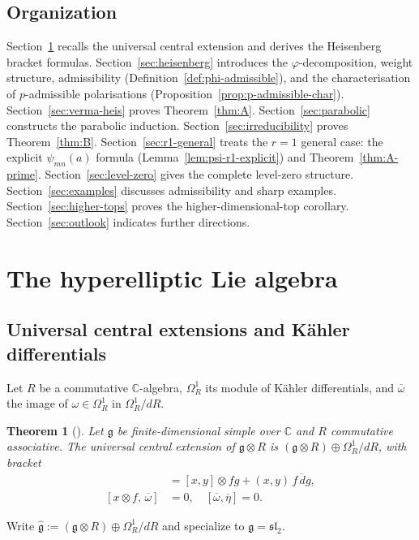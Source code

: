 \documentclass{amsart}
\newcommand{\Cx}{\mathbb{C}}
\newcommand{\g}{\mathfrak{g}}
\newcommand{\sltwo}{\mathfrak{sl}_2}
\newcommand{\wh}[1]{\widehat{#1}}
\newcommand{\whg}{\wh{\g}}
\newcommand{\ol}{\overline}
\newtheorem{theorem}{Theorem}[section]
\theoremstyle{definition}
\theoremstyle{remark}
\numberwithin{equation}{section}
\begin{document}
\subsection*{Organization}
Section~\ref{sec:hyperelliptic} recalls the universal central extension
and derives the Heisenberg bracket formulas.
Section~\ref{sec:heisenberg} introduces the $\varphi$-decomposition,
weight structure, admissibility (Definition~\ref{def:phi-admissible}),
and the characterisation of $p$-admissible polarisations
(Proposition~\ref{prop:p-admissible-char}).
Section~\ref{sec:verma-heis} proves Theorem~\ref{thm:A}.
Section~\ref{sec:parabolic} constructs the parabolic induction.
Section~\ref{sec:irreducibility} proves Theorem~\ref{thm:B}.
Section~\ref{sec:r1-general} treats the $r=1$ general case:
the explicit $\psi_{mn}(a)$ formula (Lemma~\ref{lem:psi-r1-explicit})
and Theorem~\ref{thm:A-prime}.
Section~\ref{sec:level-zero} gives the complete level-zero structure.
Section~\ref{sec:examples} discusses admissibility and sharp examples.
Section~\ref{sec:higher-tops} proves the higher-dimensional-top corollary.
Section~\ref{sec:outlook} indicates further directions.
\section{The hyperelliptic Lie algebra}\label{sec:hyperelliptic}
\subsection{Universal central extensions and K\"ahler differentials}
Let $R$ be a commutative $\Cx$-algebra, $\Omega_R^1$ its module of
K\"ahler differentials, and $\ol\omega$ the image of
$\omega\in\Omega_R^1$ in $\Omega_R^1/dR$.
\begin{theorem}[{\cite{kassel1982extensions,kassel1984kahler}}]\label{thm:KasselLoday}
Let $\g$ be finite-dimensional simple over $\Cx$ and $R$ commutative
associative.  The universal central extension of $\g\otimes R$ is
$(\g\otimes R)\oplus\Omega_R^1/dR$, with bracket
\begin{align}
[x\otimes f,\,y\otimes g]
  &=[x,y]\otimes fg+(x,y)\,\ol{f\,dg},\label{eq:uce-bracket}\\
[x\otimes f,\,\ol\omega]&=0,\quad[\ol\omega,\ol\eta]=0.\label{eq:center}
\end{align}
\end{theorem}
Write $\whg:=(\g\otimes R)\oplus\Omega_R^1/dR$ and specialize to
$\g=\sltwo$.
\end{document}

